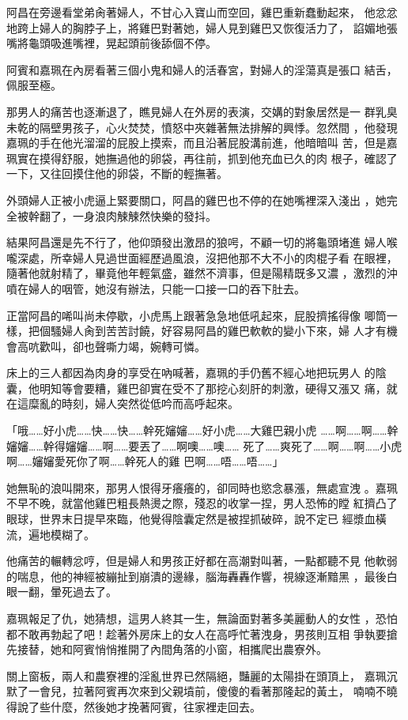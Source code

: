阿昌在旁邊看堂弟肏著婦人，不甘心入寶山而空回，雞巴重新蠢動起來，
他忿忿地跨上婦人的胸脖子上，將雞巴對著她，婦人見到雞巴又恢復活力了，
諂媚地張嘴將龜頭吸進嘴裡，晃起頭前後舔個不停。

阿賓和嘉珮在內房看著三個小鬼和婦人的活春宮，對婦人的淫蕩真是張口
結舌，佩服至極。

那男人的痛苦也逐漸退了，瞧見婦人在外房的表演，交媾的對象居然是一
群乳臭未乾的隔壁男孩子，心火焚焚，憤怒中夾雜著無法排解的興悸。忽然間
，他發現嘉珮的手在他光溜溜的屁股上摸索，而且沿著屁股溝前進，他暗暗叫
苦，但是嘉珮實在摸得舒服，她撫過他的卵袋，再往前，抓到他充血已久的肉
根子，確認了一下，又往回摸住他的卵袋，不斷的輕撫著。

外頭婦人正被小虎逼上緊要關口，阿昌的雞巴也不停的在她嘴裡深入淺出
，她完全被幹翻了，一身浪肉觫觫然快樂的發抖。

結果阿昌還是先不行了，他仰頭發出激昂的狼呺，不顧一切的將龜頭堵進
婦人喉嚨深處，所幸婦人見過世面經歷過風浪，沒把他那不大不小的肉棍子看
在眼裡，隨著他就射精了，畢竟他年輕氣盛，雖然不濟事，但是陽精既多又濃
，激烈的沖噴在婦人的咽管，她沒有辦法，只能一口接一口的吞下肚去。

正當阿昌的唏叫尚未停歇，小虎馬上跟著急急地低吼起來，屁股擠搖得像
唧筒一樣，把個騷婦人肏到苦苦討饒，好容易阿昌的雞巴軟軟的變小下來，婦
人才有機會高吭歡叫，卻也聲嘶力竭，婉轉可憐。

床上的三人都因為肉身的享受在吶喊著，嘉珮的手仍舊不經心地把玩男人
的陰囊，他明知等會要糟，雞巴卻實在受不了那挖心刻肝的刺激，硬得又漲又
痛，就在這糜亂的時刻，婦人突然從低吟而高呼起來。

「哦……好小虎……快……快……幹死嬸嬸……好小虎……大雞巴親小虎
……啊……啊……幹嬸嬸……幹得嬸嬸……啊……要丟了……啊噢……噢……
死了……爽死了……啊……啊……小虎啊……嬸嬸愛死你了啊……幹死人的雞
巴啊……唔……唔……」

她無恥的浪叫開來，那男人恨得牙癢癢的，卻同時也慾念暴漲，無處宣洩
。嘉珮不早不晚，就當他雞巴粗長熱燙之際，殘忍的收掌一捏，男人恐怖的瞠
紅擠凸了眼球，世界末日提早來臨，他覺得陰囊定然是被捏抓破碎，說不定已
經漿血橫流，遍地模糊了。

他痛苦的輾轉忿哼，但是婦人和男孩正好都在高潮對叫著，一點都聽不見
他軟弱的喘息，他的神經被繃扯到崩潰的邊緣，腦海轟轟作響，視線逐漸黯黑
，最後白眼一翻，暈死過去了。

嘉珮報足了仇，她猜想，這男人終其一生，無論面對著多美麗動人的女性
，恐怕都不敢再勃起了吧！趁著外房床上的女人在高呼忙著洩身，男孩則互相
爭執要搶先接替，她和阿賓悄悄推開了內間角落的小窗，相攜爬出農寮外。

關上窗板，兩人和農寮裡的淫亂世界已然隔絕，豔麗的太陽掛在頭頂上，
嘉珮沉默了一會兒，拉著阿賓再次來到父親墳前，傻傻的看著那隆起的黃土，
喃喃不曉得說了些什麼，然後她才挽著阿賓，往家裡走回去。

